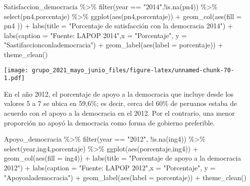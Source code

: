 \documentclass[
]{book}
\newenvironment{Shaded}{\begin{snugshade}}{\end{snugshade}}
\newcommand{\AttributeTok}[1]{\textcolor[rgb]{0.77,0.63,0.00}{#1}}
\newcommand{\FunctionTok}[1]{\textcolor[rgb]{0.00,0.00,0.00}{#1}}
\newcommand{\NormalTok}[1]{#1}
\newcommand{\SpecialCharTok}[1]{\textcolor[rgb]{0.00,0.00,0.00}{#1}}
\newcommand{\StringTok}[1]{\textcolor[rgb]{0.31,0.60,0.02}{#1}}
\begin{document}
\begin{Shaded}
\begin{Highlighting}[]
\NormalTok{Satisfaccion\_democracia }\SpecialCharTok{\%\textgreater{}\%}
  \FunctionTok{filter}\NormalTok{(year }\SpecialCharTok{==} \StringTok{"2014"}\NormalTok{,}\SpecialCharTok{!}\FunctionTok{is.na}\NormalTok{(pn4)) }\SpecialCharTok{\%\textgreater{}\%}
  \FunctionTok{select}\NormalTok{(pn4,porcentaje) }\SpecialCharTok{\%\textgreater{}\%}
  \FunctionTok{ggplot}\NormalTok{(}\FunctionTok{aes}\NormalTok{(pn4,porcentaje))  }\SpecialCharTok{+} 
  \FunctionTok{geom\_col}\NormalTok{(}\FunctionTok{aes}\NormalTok{(}\AttributeTok{fill =}\NormalTok{ pn4 )) }\SpecialCharTok{+}
  \FunctionTok{labs}\NormalTok{(}\AttributeTok{title =} \StringTok{"Porcentaje de satisfacción con la democracia 2014"}\NormalTok{) }\SpecialCharTok{+}
  \FunctionTok{labs}\NormalTok{(}\AttributeTok{caption =} \StringTok{"Fuente: LAPOP 2014"}\NormalTok{,}\AttributeTok{x =} \StringTok{"Porcentaje"}\NormalTok{, }\AttributeTok{y =} \StringTok{"Sastifaccionconlademocracia"}\NormalTok{) }\SpecialCharTok{+}
  \FunctionTok{geom\_label}\NormalTok{(}\FunctionTok{aes}\NormalTok{(}\AttributeTok{label =}\NormalTok{ porcentaje)) }\SpecialCharTok{+}
  \FunctionTok{theme\_clean}\NormalTok{()}
\end{Highlighting}
\end{Shaded}

\texttt{[image: grupo\_2021\_mayo\_junio\_files/figure-latex/unnamed-chunk-70-1.pdf]}

En el año 2012, el porcentaje de apoyo a la democracia que incluye desde los valores 5 a 7 se ubica en 59,6\%; es decir, cerca del 60\% de peruanos estaba de acuerdo con el apoyo a la democracia en el 2012. Por el contrario, una menor proporción no apoyó la democracia como forma de gobierno preferible.

\begin{Shaded}
\begin{Highlighting}[]
\NormalTok{Apoyo\_democracia }\SpecialCharTok{\%\textgreater{}\%}
  \FunctionTok{filter}\NormalTok{(year }\SpecialCharTok{==} \StringTok{"2012"}\NormalTok{, }\SpecialCharTok{!}\FunctionTok{is.na}\NormalTok{(ing4)) }\SpecialCharTok{\%\textgreater{}\%}
  \FunctionTok{select}\NormalTok{(year,ing4,porcentaje) }\SpecialCharTok{\%\textgreater{}\%}
  \FunctionTok{ggplot}\NormalTok{(}\FunctionTok{aes}\NormalTok{(porcentaje,ing4)) }\SpecialCharTok{+} 
  \FunctionTok{geom\_col}\NormalTok{(}\FunctionTok{aes}\NormalTok{(}\AttributeTok{fill =}\NormalTok{ ing4)) }\SpecialCharTok{+} 
  \FunctionTok{labs}\NormalTok{(}\AttributeTok{title =} \StringTok{"Porcentaje de apoyo a la democracia 2012"}\NormalTok{) }\SpecialCharTok{+}
  \FunctionTok{labs}\NormalTok{(}\AttributeTok{caption =} \StringTok{"Fuente: LAPOP 2012"}\NormalTok{,}\AttributeTok{x =} \StringTok{"Porcentaje"}\NormalTok{, }\AttributeTok{y =} \StringTok{"Apoyoalademocracia"}\NormalTok{) }\SpecialCharTok{+}
  \FunctionTok{geom\_label}\NormalTok{(}\FunctionTok{aes}\NormalTok{(}\AttributeTok{label =}\NormalTok{ porcentaje)) }\SpecialCharTok{+}
  \FunctionTok{theme\_clean}\NormalTok{()}
\end{Highlighting}
\end{Shaded}
\end{document}
